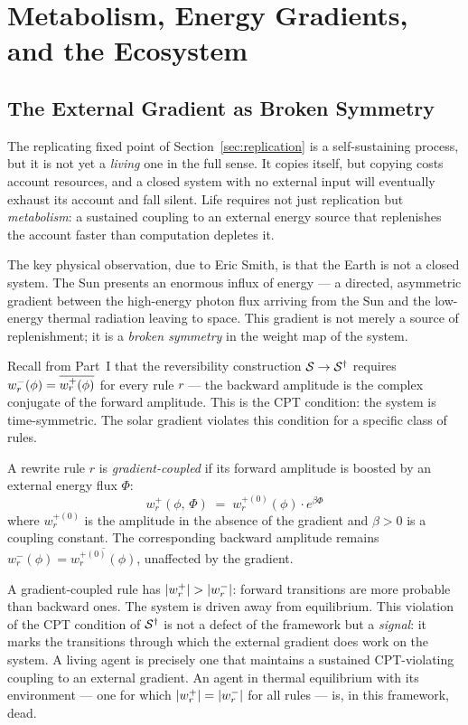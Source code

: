\chapter{Metabolism, Energy Gradients, and the Ecosystem}
\label{sec:metabolism}

\section{The External Gradient as Broken Symmetry}

The replicating fixed point of Section~\ref{sec:replication} is a
self-sustaining process, but it is not yet a \emph{living} one in
the full sense.
It copies itself, but copying costs account resources, and a closed
system with no external input will eventually exhaust its account and
fall silent.
Life requires not just replication but \emph{metabolism}: a
sustained coupling to an external energy source that replenishes
the account faster than computation depletes it.

The key physical observation, due to Eric Smith, is that the
Earth is not a closed system.
The Sun presents an enormous influx of energy --- a directed,
asymmetric gradient between the high-energy photon flux arriving
from the Sun and the low-energy thermal radiation leaving to space.
This gradient is not merely a source of replenishment; it is a
\emph{broken symmetry} in the weight map of the system.

Recall from Part~I that the reversibility construction
$\mathcal{S} \to \mathcal{S}^\dagger$ requires $w^{-}_r(\phi) = \overline{w^{+}_r(\phi)}$
for every rule $r$ --- the backward amplitude is the complex
conjugate of the forward amplitude.
This is the CPT condition: the system is time-symmetric.
The solar gradient violates this condition for a specific class
of rules.

\begin{definition}
A rewrite rule $r$ is \emph{gradient-coupled} if its forward
amplitude is boosted by an external energy flux $\Phi$:
\[
  w^+_r(\phi,\, \Phi) \;=\; w^{+(0)}_r(\phi) \cdot e^{\beta\Phi}
\]
where $w^{+(0)}_r$ is the amplitude in the absence of the
gradient and $\beta > 0$ is a coupling constant.
The corresponding backward amplitude remains
$w^-_r(\phi) = \overline{w^{+(0)}_r(\phi)}$, unaffected by the
gradient.
\end{definition}

\begin{remark}
A gradient-coupled rule has $|w^{+}_r| > |w^{-}_r|$: forward
transitions are more probable than backward ones.
The system is driven away from equilibrium.
This violation of the CPT condition of $\mathcal{S}^\dagger$ is not a
defect of the framework but a \emph{signal}: it marks the
transitions through which the external gradient does work on the
system.
A living agent is precisely one that maintains a sustained
CPT-violating coupling to an external gradient.
An agent in thermal equilibrium with its environment --- one for
which $|w^{+}_r| = |w^{-}_r|$ for all rules --- is, in this
framework, dead.
\end{remark}

